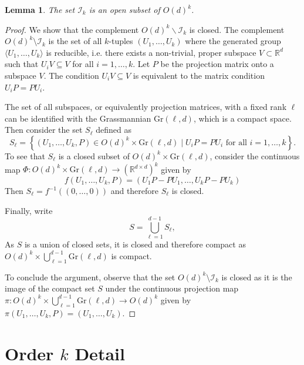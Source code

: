 \documentclass[10pt, english,oneside,reqno]{amsart}
\theoremstyle{plain}
\newtheorem{lemma}[theorem]{Lemma}
\theoremstyle{remark}
\numberwithin{equation}{section}
\numberwithin{figure}{section}
\begin{document}
\begin{lemma}\label{I_kOpen}
    The set $\mathcal{I}_k$ is an open subset of $O(d)^k$.
\end{lemma}

\begin{proof}
    We show that the complement $O(d)^k \backslash \mathcal{I}_k$ is closed. The complement $O(d)^k \setminus \mathcal{I}_k$ is the set of all $k$-tuples $(U_1, \dots, U_k)$ where the generated group $\langle U_1, \dots, U_k \rangle$ is reducible, i.e. there exists a non-trivial, proper subspace $V \subset \mathbb{R}^d$ such that $U_iV \subseteq V$ for all $i = 1, \dots, k$. Let $P$ be the projection matrix onto a subspace $V$. The condition $U_iV \subseteq V$ is equivalent to the matrix condition $U_i P = P U_i$. 
    
    The set of all subspaces, or equivalently projection matrices, with a fixed rank $\ell$ can be identified with the Grassmannian $\mathrm{Gr}(\ell, d)$, which is a compact space. Then consider the set $S_{\ell}$ defined as
$$
S_{\ell} = \left\{(U_1, \dots, U_k, P) \in O(d)^k \times \mathrm{Gr}(\ell,d) \mid U_i P = P U_i \text{ for all } i=1, \dots, k\right\}.$$
To see that $S_{\ell}$ is a closed subset of $O(d)^k \times \mathrm{Gr}(\ell,d)$, consider the continuous map $\Phi: O(d)^k \times \mathrm{Gr}(\ell,d) \to (\mathbb{R}^{d \times d})^k$ given by
$$
f(U_1, \dots, U_k, P) = (U_1 P - P U_1, \dots, U_k P - P U_k)
$$
Then $S_{\ell} = f^{-1}((0, \ldots , 0))$ and therefore $S_{\ell}$ is closed. 

Finally, write $$S = \bigcup_{\ell = 1}^{d-1} S_{\ell},$$  As $S$ is a union of closed sets, it is closed and therefore compact as $O(d)^k \times \bigcup_{\ell = 1}^{d-1} \mathrm{Gr}(\ell,d)$ is compact.

To conclude the argument, observe that the set $O(d)^k \setminus \mathcal{I}_k$ is closed as it is the image of the compact set $S$ under the continuous projection map $\pi: O(d)^k \times \bigcup_{\ell=1}^{d-1} \mathrm{Gr}(\ell,d) \to O(d)^k$ given by $\pi(U_1, \dots, U_k, P) = (U_1, \dots, U_k)$.



\end{proof}



    \section{Order $k$ Detail}

    \label{section:Detail}
\end{document}
